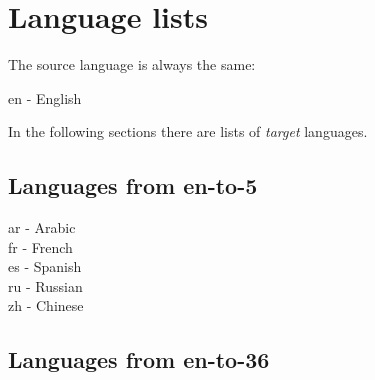 \section{Language lists}

The source language is always the same:

en - English

In the following sections there are lists of \emph{target}
languages.

\subsection{Languages from en-to-5}
\label{att:list_en-to-5}
\noindent
ar - Arabic \\
fr - French \\
es - Spanish \\
ru - Russian \\
zh - Chinese \\

\subsection{Languages from en-to-36}
\label{att:list_en-to-36}


